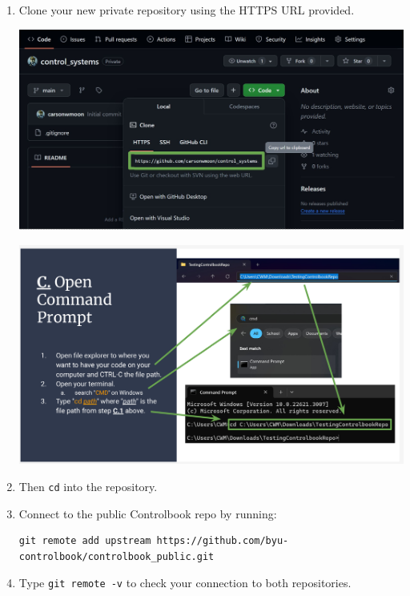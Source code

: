 \documentclass{article}
\begin{document}
\begin{enumerate}
    \item Clone your new private repository using the HTTPS URL provided.
     
\begin{center}
    \includegraphics[width=\linewidth]{pic7b-clone.png} %
\end{center}
\begin{center}
    \includegraphics[width=\linewidth]{pic7d-opening-terminal.png} %
\end{center}
    \item Then \texttt{cd} into the repository.
    \item Connect to the public Controlbook repo by running:
\begin{verbatim}
git remote add upstream https://github.com/byu-controlbook/controlbook_public.git
\end{verbatim}
    \item Type \texttt{git remote -v} to check your connection to both repositories.
\end{enumerate}
\end{document}
